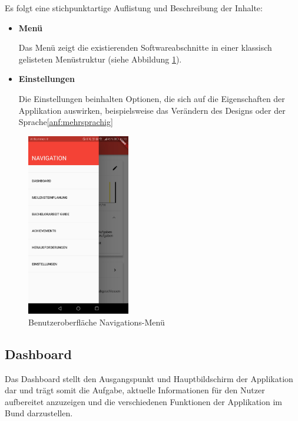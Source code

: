 \documentclass[bibliography=totoc,listof=totoc,BCOR=5mm,DIV=12,oneside]{scrbook}
\begin{document}
\par\medskip Es folgt eine stichpunktartige Auflistung und Beschreibung der Inhalte:
\begin{itemize}
\item \textbf{Menü}
\par Das Menü zeigt die existierenden Softwareabschnitte in einer klassisch gelisteten Menüstruktur (siehe Abbildung \ref{img:navigation}).
\item \textbf{Einstellungen}
\par Die Einstellungen beinhalten Optionen, die sich auf die Eigenschaften der Applikation auswirken, beispielsweise das Verändern des Designs oder der Sprache\ref{anf:mehrsprachig}
\end{itemize}

\bigskip
\begin{figure}[H]
	\centering
	\includegraphics[width=0.4\textwidth,keepaspectratio]{Bilder/Prototyp/app_screenshots/MenuScreenshot.jpg}
	\caption{Benutzeroberfläche Navigations-Menü}
	\label{img:navigation}
\end{figure}

\newpage
\subsection{Dashboard}
\par Das Dashboard stellt den Ausgangspunkt und Hauptbildschirm der Applikation dar und trägt somit die Aufgabe, aktuelle Informationen für den Nutzer aufbereitet anzuzeigen und die verschiedenen Funktionen der Applikation im Bund darzustellen.
\end{document}
